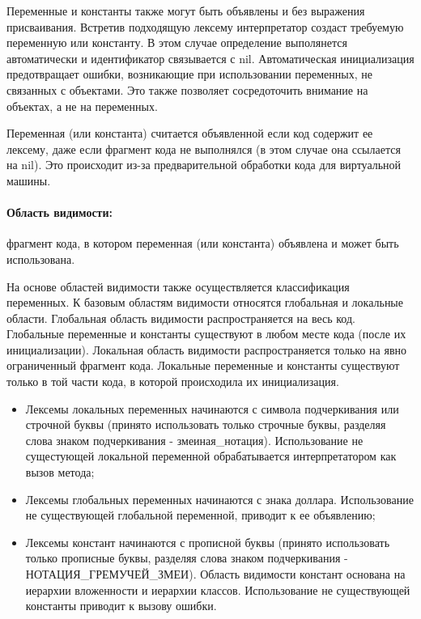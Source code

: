 Переменные и константы также могут быть объявлены и без выражения присваивания. Встретив подходящую лексему интерпретатор создаст требуемую переменную или константу. В этом случае определение выполянется автоматически и идентификатор связывается с nil. Автоматическая инициализация предотвращает ошибки, возникающие при использовании переменных, не связанных с объектами. Это также позволяет сосредоточить внимание на объектах, а не на переменных.

\begin{note}
  Переменная (или константа) считается объявленной если код содержит ее лексему, даже если фрагмент кода не выполнялся (в этом случае она ссылается на nil). Это происходит из-за предварительной обработки кода для виртуальной машины.
\end{note}

\paragraph*{Область видимости:} фрагмент кода, в котором переменная (или константа) объявлена и может быть использована. 

На основе областей видимости также осуществляется классификация переменных. К базовым областям видимости относятся глобальная и локальные области. Глобальная область видимости распространяется на весь код. Глобальные переменные и константы существуют в любом месте кода (после их инициализации).	Локальная область видимости распространяется только на явно ограниченный фрагмент кода. Локальные переменные и константы существуют только в той части кода, в которой происходила их инициализация.

\begin{itemize}
  \item Лексемы локальных переменных начинаются с символа подчеркивания или строчной буквы (принято использовать только строчные буквы, разделяя слова знаком подчеркивания - змеиная_нотация). Использование не сущестующей локальной переменной обрабатывается интерпретатором как вызов метода;

  \item Лексемы глобальных переменных начинаются с знака доллара. Использование не существующей глобальной переменной, приводит к ее объявлению;

  \item Лексемы констант начинаются с прописной буквы (принято использовать только прописные буквы, разделяя слова знаком подчеркивания - НОТАЦИЯ_ГРЕМУЧЕЙ_ЗМЕИ). Область видимости констант основана на иерархии вложенности и иерархии классов. Использование не существующей константы приводит к вызову ошибки.
\end{itemize}

